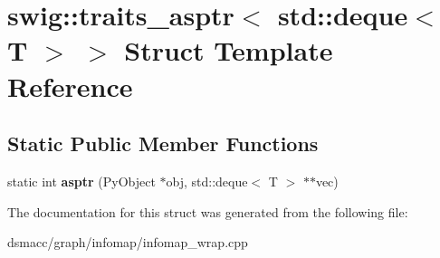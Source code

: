 \hypertarget{structswig_1_1traits__asptr_3_01std_1_1deque_3_01T_01_4_01_4}{}\section{swig\+:\+:traits\+\_\+asptr$<$ std\+:\+:deque$<$ T $>$ $>$ Struct Template Reference}
\label{structswig_1_1traits__asptr_3_01std_1_1deque_3_01T_01_4_01_4}
\subsection*{Static Public Member Functions}
\begin{DoxyCompactItemize}
\item 
\mbox{\label{structswig_1_1traits__asptr_3_01std_1_1deque_3_01T_01_4_01_4_ae5434f66070f1147fda3dd67219369f0}} 
static int {\bfseries asptr} (Py\+Object $\ast$obj, std\+::deque$<$ T $>$ $\ast$$\ast$vec)
\end{DoxyCompactItemize}


The documentation for this struct was generated from the following file\+:\begin{DoxyCompactItemize}
\item 
dsmacc/graph/infomap/infomap\+\_\+wrap.\+cpp\end{DoxyCompactItemize}
